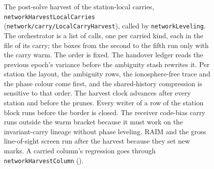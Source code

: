 \documentclass[main.tex]{subfiles}
\begin{document}
\begin{figure}[tbp]
{}
\caption{The post-solve harvest of the station-local carries,
\texttt{networkHarvestLocalCarries} (\texttt{network/carry/LocalCarryHarvest}),
called by \texttt{networkLeveling}. The orchestrator is a list of calls, one per
carried kind, each in the file of its carry; the boxes from the second to the
fifth run only with the carry warm. The order is fixed. The handover ledger
reads the previous epoch's variance before the ambiguity stash rewrites it. Per
station the layout, the ambiguity rows, the ionosphere-free trace and the phase
colour come first, and the shared-history compression is sensitive to that
order. The harvest clock advances after every station and before the prunes.
Every writer of a row of the station block runs before the border is closed. The
receiver code-bias carry runs outside the warm bracket because it must work on
the invariant-carry lineage without phase leveling. RAIM and the gross
line-of-sight screen run after the harvest because they set new marks. A
carried column's regression goes through \texttt{networkHarvestColumn}
().}
\label{fig:net-harvest}
\end{figure}

\ifSubfilesClassLoaded{\printbibliography}{}
\end{document}
